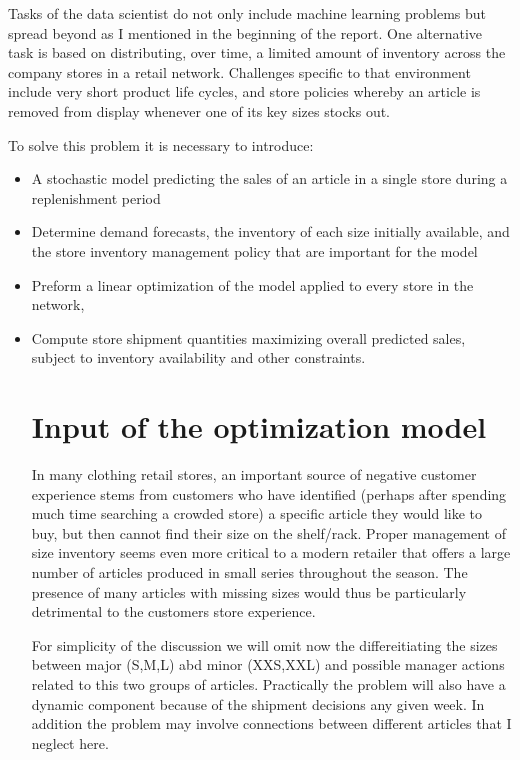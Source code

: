 \documentclass[11pt,fleqn]{book} %
\begin{document}
Tasks of the data scientist do not only include machine learning problems but spread beyond as I mentioned in the beginning of the report. One alternative task is based on distributing, over time, a limited amount of inventory across the company stores in a retail network. Challenges specific to that environment include very short product life cycles, and store policies whereby an article is removed from display whenever one of its key sizes stocks out. 

To solve this problem it is necessary to introduce:
\begin{itemize}
\item A stochastic model predicting the sales of an article in a single store during a replenishment period
\item Determine demand forecasts, the inventory of each size initially available, and the store inventory management policy that are important for the model
\item Preform a linear optimization of the model applied to every store in the network, 
\item Compute store shipment quantities maximizing overall predicted sales, subject to inventory availability and other constraints. 

\section{Input of the optimization model}
In many clothing retail stores, an important source of negative customer experience stems from customers who have identified (perhaps after spending much time searching a crowded store) a specific article they would like to buy, but then cannot find their size on the shelf/rack. Proper management of size inventory seems even more critical to a modern retailer that offers a large number of articles produced in small series throughout the season. The presence of many articles with missing sizes would thus be particularly detrimental to the customers store experience. 
\begin{remark}
For simplicity of the discussion we will omit now the differeitiating the sizes between major (S,M,L) abd minor (XXS,XXL) and possible manager actions related to this two groups of articles. Practically the problem will also have a dynamic component because of the shipment decisions any given week. In addition the problem may involve connections between different articles that I neglect here.
\end{remark}


\end{itemize}
\end{document}
